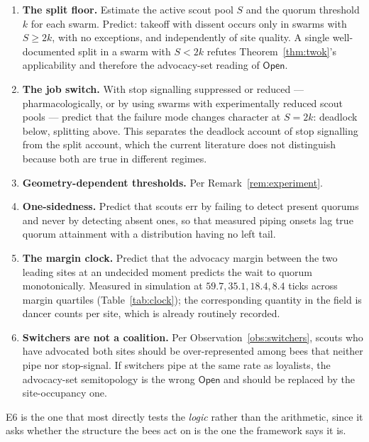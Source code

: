 \documentclass[11pt,a4paper]{article}
\theoremstyle{plain}
\theoremstyle{definition}
\theoremstyle{remark}
\newcommand{\Open}{\mathsf{Open}}
\begin{document}
\begin{enumerate}[label=E\arabic*.,leftmargin=2.4em]
\item \textbf{The split floor.} Estimate the active scout pool $S$ and the
      quorum threshold $k$ for each swarm. Predict: takeoff with dissent occurs
      only in swarms with $S \ge 2k$, with no exceptions, and independently of
      site quality. A single well-documented split in a swarm with $S < 2k$
      refutes Theorem~\ref{thm:twok}'s applicability and therefore the
      advocacy-set reading of $\Open$.
\item \textbf{The job switch.} With stop signalling suppressed or reduced ---
      pharmacologically, or by using swarms with experimentally reduced scout
      pools --- predict that the failure mode changes character at $S = 2k$:
      deadlock below, splitting above. This separates the deadlock account of
      stop signalling from the split account, which the current literature does
      not distinguish because both are true in different regimes.
\item \textbf{Geometry-dependent thresholds.} Per Remark~\ref{rem:experiment}.
\item \textbf{One-sidedness.} Predict that scouts err by failing to detect
      present quorums and never by detecting absent ones, so that measured
      piping onsets lag true quorum attainment with a distribution having no
      left tail.
\item \textbf{The margin clock.} Predict that the advocacy margin between the
      two leading sites at an undecided moment predicts the wait to quorum
      monotonically. Measured in simulation at $59.7, 35.1, 18.4, 8.4$ ticks
      across margin quartiles (Table~\ref{tab:clock}); the corresponding
      quantity in the field is dancer counts per site, which is already
      routinely recorded.
\item \textbf{Switchers are not a coalition.} Per
      Observation~\ref{obs:switchers}, scouts who have advocated both sites
      should be over-represented among bees that neither pipe nor stop-signal.
      If switchers pipe at the same rate as loyalists, the advocacy-set
      semitopology is the wrong $\Open$ and should be replaced by the
      site-occupancy one.
\end{enumerate}

E6 is the one that most directly tests the \emph{logic} rather than the
arithmetic, since it asks whether the structure the bees act on is the one the
framework says it is.
\end{document}
